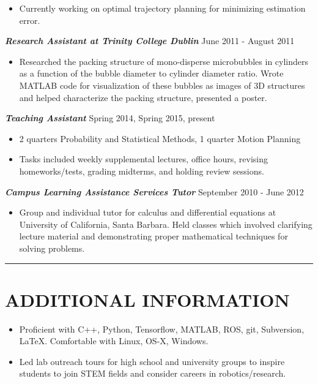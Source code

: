 \documentclass{res}
\begin{document}
\begin{resume}
\begin{itemize}
\item Currently working on optimal trajectory planning for minimizing estimation error.
\end{itemize}
\vspace*{-1ex}
{\sl \bf Research Assistant at Trinity College Dublin} \hfill June 2011 - August 2011
\vspace*{.5ex}
\begin{itemize}
\item Researched the packing structure of mono-disperse microbubbles in cylinders as a function of the bubble diameter to cylinder diameter ratio. Wrote MATLAB code for visualization of these bubbles as images of 3D structures and helped characterize the packing structure, presented a poster.
\end{itemize}
\vspace*{-1ex}
{\sl \bf Teaching Assistant} \hfill Spring 2014, Spring 2015, present
\vspace*{.5ex}
\begin{itemize}
\item 2 quarters Probability and Statistical Methods, 1 quarter Motion Planning
\vspace*{-.5ex}
\item Tasks included weekly supplemental lectures, office hours, revising homeworks/tests, grading midterms, and holding review sessions.
\end{itemize}
\vspace*{-1ex}
{\sl \bf Campus Learning Assistance Services Tutor} \hfill September 2010 - June 2012
\vspace*{.5ex}
\begin{itemize}
\item Group and individual tutor for calculus and differential equations at University of California, Santa Barbara. Held classes which involved clarifying lecture material and demonstrating proper mathematical techniques for solving problems.
\end{itemize}
\vspace*{-3ex}
\hspace{-8.5ex}\rule{16.5cm}{0.4pt}
\vspace*{-3ex}

\section{ADDITIONAL INFORMATION}
\vspace{3ex}
\begin{itemize}
\item Proficient with C++, Python, Tensorflow, MATLAB, ROS, git, Subversion, LaTeX. Comfortable with Linux, OS-X, Windows.
\item Led lab outreach tours for high school and university groups to inspire students to join STEM fields and consider careers in robotics/research.
\end{itemize}



\end{resume}
\end{document}
